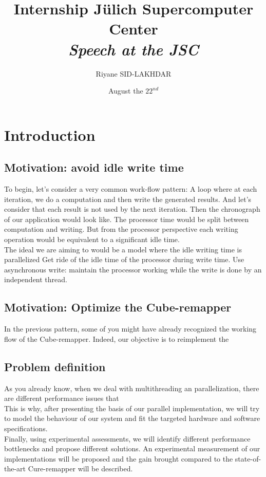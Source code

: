 \documentclass[12pt]{article}											%
\title
{
	Internship Jülich Supercomputer Center\\
	\emph{Speech at the JSC}
}
\author{Riyane SID-LAKHDAR}
\date{August the $22^{nd}$}
\begin{document}
\maketitle

\begin{abstract}
\end{abstract}

\tableofcontents
\newpage



\section{Introduction}
\subsection{Motivation: avoid idle write time}
	To begin, let's consider a very common work-flow pattern:   A loop where at each iteration, we do a computation and then write the generated results.   And let's consider that each result is not used by the next iteration.   Then the chronograph of our application would look like.
	The processor time would be split between computation and writing.   But from the processor perspective each writing operation would be equivalent to a significant idle time.\\
	
	The ideal we are aiming to would be a model where the idle writing time is parallelized
	Get ride of the idle time of the processor during write time.   Use asynchronous write: maintain the processor working while the write is done by an independent thread.



\subsection{Motivation: Optimize the Cube-remapper}
	In the previous pattern, some of you might have already recognized the working flow of the Cube-remapper.   Indeed, our objective is to reimplement the 

\subsection{Problem definition}
	As you already know, when we deal with multithreading an parallelization, there are different performance issues that\\
	This is why, after presenting the basis of our parallel implementation, we will try to model the behaviour of our system and fit the targeted hardware and software specifications.\\
	Finally, using experimental assessments, we will identify different performance bottlenecks and propose different solutions.   An experimental measurement of our implementations will be proposed and the gain brought compared to the state-of-the-art Cure-remapper will be described.
\end{document}
